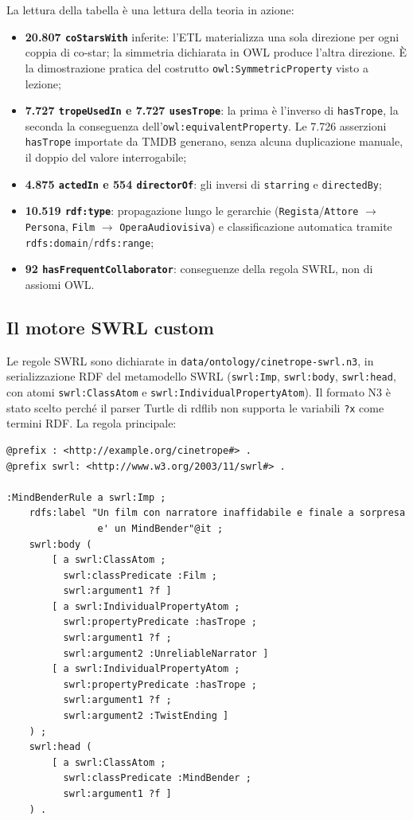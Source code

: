 \documentclass[a4paper,11pt]{article}
\newcommand{\code}[1]{\texttt{#1}}
\begin{document}
La lettura della tabella \`e una lettura della teoria in azione:

\begin{itemize}
  \item \textbf{20.807 \code{coStarsWith}} inferite: l'ETL materializza una
        sola direzione per ogni coppia di co-star; la simmetria dichiarata
        in OWL produce l'altra direzione. \`E la dimostrazione pratica del
        costrutto \code{owl:SymmetricProperty} visto a lezione;
  \item \textbf{7.727 \code{tropeUsedIn} e 7.727 \code{usesTrope}}: la prima
        \`e l'inverso di \code{hasTrope}, la seconda la conseguenza
        dell'\code{owl:equivalentProperty}. Le 7.726 asserzioni
        \code{hasTrope} importate da TMDB generano, senza alcuna duplicazione
        manuale, il doppio del valore interrogabile;
  \item \textbf{4.875 \code{actedIn} e 554 \code{directorOf}}: gli inversi
        di \code{starring} e \code{directedBy};
  \item \textbf{10.519 \code{rdf:type}}: propagazione lungo le gerarchie
        (\code{Regista}/\code{Attore} $\rightarrow$ \code{Persona},
        \code{Film} $\rightarrow$ \code{OperaAudiovisiva}) e classificazione
        automatica tramite \code{rdfs:domain}/\code{rdfs:range};
  \item \textbf{92 \code{hasFrequentCollaborator}}: conseguenze della regola
        SWRL, non di assiomi OWL.
\end{itemize}

\subsection{Il motore SWRL custom}\label{sec:swrl}

Le regole SWRL sono dichiarate in
\code{data/ontology/cinetrope-swrl.n3}, in serializzazione RDF del
metamodello SWRL (\code{swrl:Imp}, \code{swrl:body}, \code{swrl:head}, con
atomi \code{swrl:ClassAtom} e \code{swrl:IndividualPropertyAtom}). Il
formato N3 \`e stato scelto perch\'e il parser Turtle di rdflib non
supporta le variabili \code{?x} come termini RDF. La regola principale:

\begin{lstlisting}[style=ttl, caption={La regola MindBenderRule in
\code{cinetrope-swrl.n3} (metamodello SWRL in RDF).}]
@prefix : <http://example.org/cinetrope#> .
@prefix swrl: <http://www.w3.org/2003/11/swrl#> .

:MindBenderRule a swrl:Imp ;
    rdfs:label "Un film con narratore inaffidabile e finale a sorpresa
                e' un MindBender"@it ;
    swrl:body (
        [ a swrl:ClassAtom ;
          swrl:classPredicate :Film ;
          swrl:argument1 ?f ]
        [ a swrl:IndividualPropertyAtom ;
          swrl:propertyPredicate :hasTrope ;
          swrl:argument1 ?f ;
          swrl:argument2 :UnreliableNarrator ]
        [ a swrl:IndividualPropertyAtom ;
          swrl:propertyPredicate :hasTrope ;
          swrl:argument1 ?f ;
          swrl:argument2 :TwistEnding ]
    ) ;
    swrl:head (
        [ a swrl:ClassAtom ;
          swrl:classPredicate :MindBender ;
          swrl:argument1 ?f ]
    ) .
\end{lstlisting}
\end{document}
